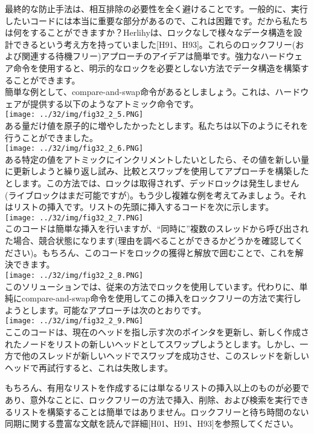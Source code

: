 最終的な防止手法は、相互排除の必要性を全く避けることです。一般的に、実行したいコードには本当に重要な部分があるので、これは困難です。だから私たちは何をすることができますか？Herlihyは、ロックなしで様々なデータ構造を設計できるという考え方を持っていました{[}H91、H93{]}。これらのロックフリー(および関連する待機フリー)アプローチのアイデアは簡単です。強力なハードウェア命令を使用すると、明示的なロックを必要としない方法でデータ構造を構築することができます。\\
簡単な例として、compare-and-swap命令があるとしましょう。これは、ハードウェアが提供する以下のようなアトミック命令です。\\
\texttt{[image: ../32/img/fig32\_2\_5.PNG]}\\
ある量だけ値を原子的に増やしたかったとします。私たちは以下のようにそれを行うことができました。\\
\texttt{[image: ../32/img/fig32\_2\_6.PNG]}\\
ある特定の値をアトミックにインクリメントしたいとしたら、その値を新しい量に更新しようと繰り返し試み、比較とスワップを使用してアプローチを構築したとします。この方法では、ロックは取得されず、デッドロックは発生しません(ライブロックはまだ可能ですが)。もう少し複雑な例を考えてみましょう。それはリストの挿入です。リストの先頭に挿入するコードを次に示します。\\
\texttt{[image: ../32/img/fig32\_2\_7.PNG]}\\
このコードは簡単な挿入を行いますが、``同時に''複数のスレッドから呼び出された場合、競合状態になります(理由を調べることができるかどうかを確認してください)。もちろん、このコードをロックの獲得と解放で囲むことで、これを解決できます。\\
\texttt{[image: ../32/img/fig32\_2\_8.PNG]}\\
このソリューションでは、従来の方法でロックを使用しています。代わりに、単純にcompare-and-swap命令を使用してこの挿入をロックフリーの方法で実行しようとします。可能なアプローチは次のとおりです。\\
\texttt{[image: ../32/img/fig32\_2\_9.PNG]}\\
ここのコードは、現在のヘッドを指し示す次のポインタを更新し、新しく作成されたノードをリストの新しいヘッドとしてスワップしようとします。しかし、一方で他のスレッドが新しいヘッドでスワップを成功させ、このスレッドを新しいヘッドで再試行すると、これは失敗します。

もちろん、有用なリストを作成するには単なるリストの挿入以上のものが必要であり、意外なことに、ロックフリーの方法で挿入、削除、および検索を実行できるリストを構築することは簡単ではありません。ロックフリーと待ち時間のない同期に関する豊富な文献を読んで詳細{[}H01、H91、H93{]}を参照してください。

